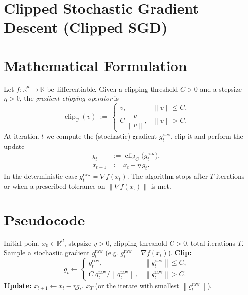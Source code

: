 \documentclass{article}
\newcommand{\norm}[1]{\left\lVert#1\right\rVert}
\begin{document}
\section*{Clipped Stochastic Gradient Descent (Clipped SGD)}

\section*{Mathematical Formulation}
Let $f:\mathbb{R}^d\rightarrow\mathbb{R}$ be differentiable.
Given a clipping threshold $C>0$ and a stepsize $\eta>0$, the
\emph{gradient clipping operator} is
\[
\operatorname{clip}_C(v)\;:=\;
\begin{cases}
v, & \norm{v}\le C,\\[4pt]
C\,\dfrac{v}{\norm{v}}, & \norm{v}>C .
\end{cases}
\]
At iteration $t$ we compute the (stochastic) gradient $g_t^{\text{raw}}$,
clip it and perform the update
\[
\boxed{
\begin{aligned}
g_t &:= \operatorname{clip}_C\!\bigl(g_t^{\text{raw}}\bigr),\\
x_{t+1} &:= x_t - \eta\, g_t .
\end{aligned}}
\tag{1}
\]
In the deterministic case $g_t^{\text{raw}}=\nabla f(x_t)$.
The algorithm stops after $T$ iterations or when a prescribed tolerance on
$\norm{\nabla f(x_t)}$ is met.

\section*{Pseudocode}
\begin{algorithm}[H]
\caption{Clipped SGD}
\begin{algorithmic}[1]
\Require Initial point $x_0\in\mathbb{R}^d$, stepsize $\eta>0$, clipping threshold $C>0$, total iterations $T$.
    \State Sample a stochastic gradient $g_t^{\text{raw}}$ (e.g. $g_t^{\text{raw}}=\nabla f(x_t)$).
    \State \textbf{Clip:}
          \[
          g_t \gets 
          \begin{cases}
          g_t^{\text{raw}}, & \norm{g_t^{\text{raw}}}\le C,\\
          C\;g_t^{\text{raw}}/\norm{g_t^{\text{raw}}}, & \norm{g_t^{\text{raw}}}> C .
          \end{cases}
          \]
    \State \textbf{Update:} $x_{t+1}\gets x_t-\eta g_t$.
\EndFor
\State \Return $x_T$ (or the iterate with smallest $\norm{g_t^{\text{raw}}}$).
\end{algorithmic}
\end{algorithm}
\end{document}
